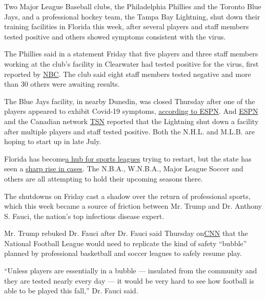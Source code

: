 Two Major League Baseball clubs, the Philadelphia Phillies and the
Toronto Blue Jays, and a professional hockey team, the Tampa Bay
Lightning, shut down their training facilities in Florida this week,
after several players and staff members tested positive and others
showed symptoms consistent with the virus.

The Phillies said in a statement Friday that five players and three
staff members working at the club's facility in Clearwater had tested
positive for the virus, first reported by
\href{https://www.nbcsports.com/philadelphia/phillies/phillies-coronavirus-outbreak-clearwater-players-staff}{NBC}.
The club said eight staff members tested negative and more than 30
others were awaiting results.

The Blue Jays facility, in nearby Dunedin, was closed Thursday after one
of the players appeared to exhibit Covid-19 symptoms,
\href{https://twitter.com/JeffPassan/status/1274042733154492418}{according
to ESPN}. And
\href{https://www.espn.com/nhl/story/_/id/29334802/source-lightning-close-facility-due-coronavirus-outbreak}{ESPN}
and the Canadian network
\href{https://www.tsn.ca/tampa-bay-lightning-temporarily-close-training-facilities-due-to-covid-19-1.1487646}{TSN}
reported that the Lightning shut down a facility after multiple players
and staff tested positive. Both the N.H.L. and M.L.B. are hoping to
start up in late July.

Florida has
become\href{https://www.nytimes3xbfgragh.onion/2020/06/18/sports/basketball/nba-disney-world-mls.html}{a
hub for sports leagues} trying to restart, but the state has seen a
\href{https://www.nytimes3xbfgragh.onion/2020/06/18/sports/basketball/nba-disney-world-mls.html}{sharp
rise in cases}. The N.B.A., W.N.B.A., Major League Soccer and others are
all attempting to hold their upcoming seasons there.

The shutdowns on Friday cast a shadow over the return of professional
sports, which this week became a source of friction between Mr. Trump
and Dr. Anthony S. Fauci, the nation's top infectious disease expert.

Mr. Trump rebuked Dr. Fauci after Dr. Fauci said Thursday
on\href{https://www.cnn.com/2020/06/18/us/football-happen-fauci-spt-trnd/index.html}{CNN}
that the National Football League would need to replicate the kind of
safety ``bubble'' planned by professional basketball and soccer leagues
to safely resume play.

``Unless players are essentially in a bubble --- insulated from the
community and they are tested nearly every day --- it would be very hard
to see how football is able to be played this fall,'' Dr. Fauci said.


